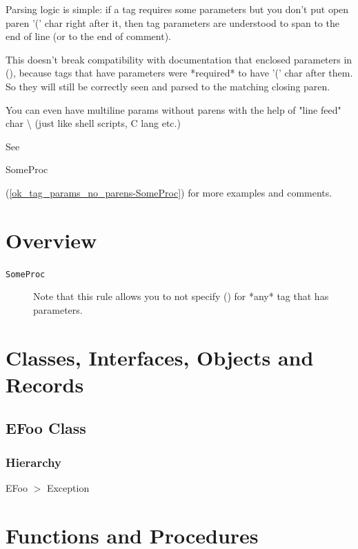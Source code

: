 \documentclass{report}
\begin{document}
Parsing logic is simple: if a tag requires some parameters but you don't put open paren '(' char right after it, then tag parameters are understood to span to the end of line (or to the end of comment).

This doesn't break compatibility with documentation that enclosed parameters in (), because tags that have parameters were *required* to have '(' char after them. So they will still be correctly seen and parsed to the matching closing paren.

You can even have multiline params without parens with the help of "line feed" char {\textbackslash} (just like shell scripts, C lang etc.)

See \begin{ttfamily}SomeProc\end{ttfamily}(\ref{ok_tag_params_no_parens-SomeProc}) for more examples and comments.

   
\section{Overview}
\begin{description}
\item[\texttt{\begin{ttfamily}EFoo\end{ttfamily} Class}]
\end{description}
\begin{description}
\item[\texttt{SomeProc}]Note that this rule allows you to not specify () for *any* tag that has parameters.
\end{description}
\section{Classes, Interfaces, Objects and Records}
\subsection*{EFoo Class}
\subsubsection*{\large{\textbf{Hierarchy}}\normalsize\hspace{1ex}\hfill}
EFoo {$>$} Exception
\section{Functions and Procedures}
\end{document}
